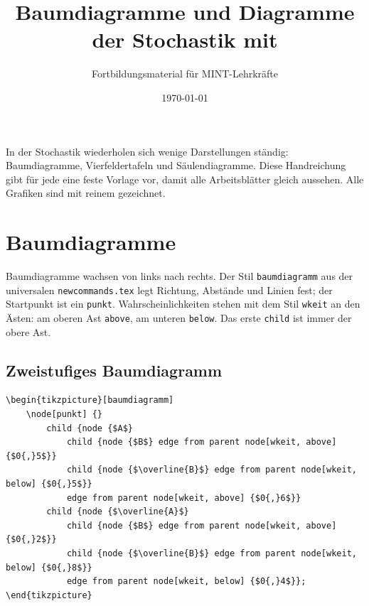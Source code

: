 



\title{Baumdiagramme und Diagramme der Stochastik mit \TikZ}
\author{Fortbildungsmaterial für MINT-Lehrkräfte}
\date{\today}
\pagestyle{plain}
\setlength{\parskip}{1.5em} %




\maketitle

In der Stochastik wiederholen sich wenige Darstellungen ständig: Baumdiagramme, Vierfeldertafeln und Säulendiagramme. Diese Handreichung gibt für jede eine feste Vorlage vor, damit alle Arbeitsblätter gleich aussehen. Alle Grafiken sind mit reinem \TikZ gezeichnet.



\section{Baumdiagramme}

Baumdiagramme wachsen von links nach rechts. Der Stil \texttt{baumdiagramm} aus der universalen \texttt{newcommands.tex} legt Richtung, Abstände und Linien fest; der Startpunkt ist ein \texttt{punkt}. Wahrscheinlichkeiten stehen mit dem Stil \texttt{wkeit} an den Ästen: am oberen Ast \texttt{above}, am unteren \texttt{below}. Das erste \texttt{child} ist immer der obere Ast.


\subsection{Zweistufiges Baumdiagramm}

\begin{lstlisting}[style=latex]
\begin{tikzpicture}[baumdiagramm]
	\node[punkt] {}
		child {node {$A$}
			child {node {$B$} edge from parent node[wkeit, above] {$0{,}5$}}
			child {node {$\overline{B}$} edge from parent node[wkeit, below] {$0{,}5$}}
			edge from parent node[wkeit, above] {$0{,}6$}}
		child {node {$\overline{A}$}
			child {node {$B$} edge from parent node[wkeit, above] {$0{,}2$}}
			child {node {$\overline{B}$} edge from parent node[wkeit, below] {$0{,}8$}}
			edge from parent node[wkeit, below] {$0{,}4$}};
\end{tikzpicture}
\end{lstlisting}

